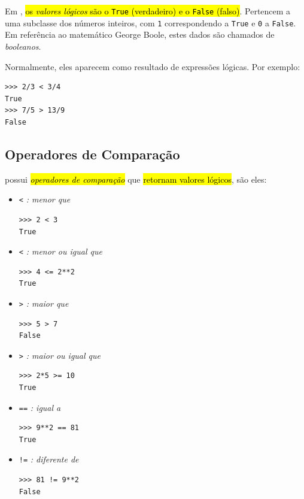 Em {\python}, \hl{os \emph{valores lógicos} são o {\lstinline+True+} (verdadeiro) e o {\lstinline+False+} (falso)}. Pertencem a uma subclasse dos números inteiros, com \lstinline+1+ correspondendo a \lstinline+True+ e \lstinline+0+ a \lstinline+False+. Em referência ao matemático George Boole{\boole}, estes dados são chamados de \emph{booleanos}.

Normalmente, eles aparecem como resultado de expressões lógicas. Por exemplo:
\begin{lstlisting}
>>> 2/3 < 3/4
True
>>> 7/5 > 13/9
False
\end{lstlisting}

\subsection{Operadores de Comparação}

{\python} possui \hl{\emph{operadores de comparação}} que \hl{retornam valores lógicos}, são eles:
\begin{itemize}
\item \lstinline+<+ \emph{: menor que}

\begin{lstlisting}
>>> 2 < 3
True
\end{lstlisting}

\item \lstinline+<+ \emph{: menor ou igual que}

\begin{lstlisting}
>>> 4 <= 2**2
True
\end{lstlisting}

\item \lstinline+>+ \emph{: maior que}

\begin{lstlisting}
>>> 5 > 7
False
\end{lstlisting}

\item \lstinline+>+ \emph{: maior ou igual que}

\begin{lstlisting}
>>> 2*5 >= 10
True
\end{lstlisting}

\item \lstinline+==+ \emph{: igual a}

\begin{lstlisting}
>>> 9**2 == 81
True
\end{lstlisting}

\item \lstinline+!=+ \emph{: diferente de}

\begin{lstlisting}
>>> 81 != 9**2
False
\end{lstlisting}
\end{itemize}

